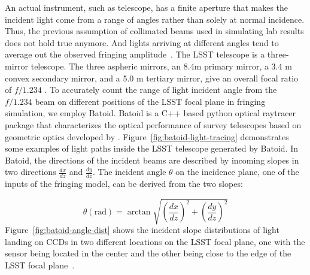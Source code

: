 \documentclass[twocolumn]{aastex63} %
\begin{document}
\begin{CJK*}{UTF8}{gbsn}
An actual instrument, such as telescope, has a finite aperture that makes the incident light come from a range of angles rather than solely at normal incidence. Thus, the previous assumption of collimated beams used in simulating lab results does not hold true anymore. And lights arriving at different angles tend to average out the observed fringing amplitude~\citep{Groom17}. The LSST telescope is a three-mirror telescope. The three aspheric mirrors, an 8.4m primary mirror, a 3.4 m convex secondary mirror, and a 5.0 m tertiary mirror, give an overall focal ratio of $f/1.234$ \citep{Bond18,Ivezi19,Olivier08}. To accurately count the range of light incident angle from the $f/1.234$ beam on different positions of the LSST focal plane in fringing simulation, we employ Batoid. Batoid is a C++ based python optical raytracer package that characterizes the optical performance of survey telescopes based on geometric optics developed by \citet{Mayers19}. Figure~\ref{fig:batoid-light-tracing} demonstrates some examples of light paths inside the LSST telescope generated by Batoid. In Batoid, the directions of the incident beams are described by incoming slopes in two directions $\frac{dx}{dz}$ and $\frac{dy}{dz}$. The incident angle $\theta$ on the incidence plane, one of the inputs of the fringing model, can be derived from the two slopes: 

\begin{equation*}
    \theta (\mbox{rad}) = \arctan{\sqrt{\left(\frac{dx}{dz}\right)^2+\left(\frac{dy}{dz}\right)^2}}
\end{equation*}
Figure~\ref{fig:batoid-angle-dist} shows the incident slope distributions of light landing on CCDs in two different locations on the LSST focal plane, one with the sensor being located in the center and the other being close to the edge of the LSST focal plane~\citep{Ivezi19}.



\end{CJK*}
\end{document}
